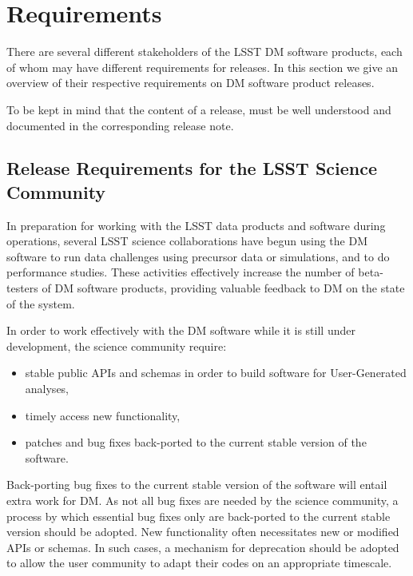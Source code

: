 \section{Requirements} \label{sec:reqs}

There are several different stakeholders of the \gls{LSST} \gls{DM} software products, each of whom may have different requirements for releases.
In this section we give an overview of their respective requirements on  \gls{DM} software product releases.

To be kept in mind that the content of a release, must be well understood and documented in the corresponding release note.

\subsection{Release Requirements for the \gls{LSST} Science Community} \label{sec:comreqs}

In preparation for working with the \gls{LSST} data products and software during operations, several \gls{LSST} science collaborations have begun using the \gls{DM} software to run data challenges using precursor data or simulations, and to do performance studies. These activities effectively increase the number of beta-testers of \gls{DM} software products, providing valuable feedback to \gls{DM} on the state of the system. 

In order to work effectively with the \gls{DM} software while it is still under development, the science community require: 
\begin{itemize}
\item stable public APIs and schemas in order to build software for User-Generated analyses, 
\item timely access new functionality,  
\item patches and bug fixes back-ported to the current stable version of the software. 
\end{itemize}

Back-porting bug fixes to the current stable version of the software will entail extra work for \gls{DM}. 
As not all bug fixes are needed by the science community, a process by which essential bug fixes only are back-ported to the current stable version should be adopted. 
New functionality often necessitates new or modified APIs or schemas. 
In such cases, a mechanism for deprecation should be adopted to allow the user community to adapt their codes on an appropriate timescale.  

